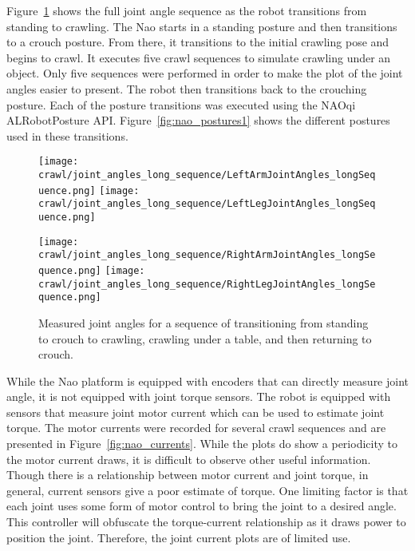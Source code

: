 Figure~\ref{fig:nao_joint_angles_long_seq} shows the full joint angle sequence as the robot
transitions from standing to crawling. The Nao starts in a standing posture and then transitions
to a crouch posture. From there, it transitions to the initial crawling pose and begins to
crawl. It executes five crawl sequences to simulate crawling under an object.
Only five sequences were performed in order to make the plot of the joint angles easier to present.
The robot then transitions back to the crouching posture. Each of the posture transitions was
executed using the NAOqi ALRobotPosture API\@.
Figure~\ref{fig:nao_postures1} shows the different postures used in these transitions.

\begin{figure}
\centering
\texttt{[image: crawl/joint\_angles\_long\_sequence/LeftArmJointAngles\_longSequence.png]}
\texttt{[image: crawl/joint\_angles\_long\_sequence/LeftLegJointAngles\_longSequence.png]}

\centering
\texttt{[image: crawl/joint\_angles\_long\_sequence/RightArmJointAngles\_longSequence.png]}
\texttt{[image: crawl/joint\_angles\_long\_sequence/RightLegJointAngles\_longSequence.png]}

\caption{Measured joint angles for a sequence of transitioning from standing to crouch to crawling,
         crawling under a table, and then returning to crouch.}
\label{fig:nao_joint_angles_long_seq}
\end{figure}

While the Nao platform is equipped with encoders that can directly measure joint
angle, it is not equipped with joint torque sensors. The robot is equipped with sensors
that measure joint motor current which can be used to estimate joint torque. The motor currents
were recorded for several crawl sequences and are presented in Figure~\ref{fig:nao_currents}.
While the plots do show a periodicity to the motor current draws, it is difficult to observe
other useful information. Though there is a relationship between motor current and joint torque, 
in general, current sensors give a poor estimate of torque. One limiting factor is that each joint uses
some form of motor control to bring the joint to a desired angle. This controller will
obfuscate the torque-current relationship as it draws power to position the joint.
Therefore, the joint current plots are of limited use.

